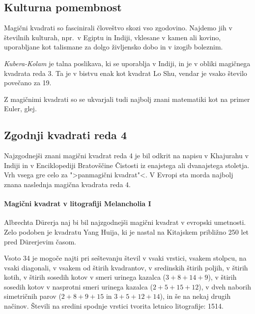 \documentclass[a4paper,12pt]{article}
\theoremstyle{definition}
\theoremstyle{plain}
\begin{document}

\subsection{Kulturna pomembnost}

Magični kvadrati so fascinirali človeštvo skozi vso zgodovino. Najdemo jih
v številnih kulturah, npr.\ v Egiptu in Indiji, vklesane v kamen ali
kovino, uporabljane kot talismane za dolgo življensko dobo in v
izogib boleznim.

\emph{Kubera-Kolam} je talna poslikava, ki se uporablja v Indiji, in je v
obliki magičnega kvadrata reda 3. Ta je v bistvu enak kot kvadrat
Lo Shu, vendar je vsako število povečano za 19.

Z magičnimi kvadrati so se ukvarjali tudi najbolj znani matematiki kot na
primer Euler, glej\cite{euler}. %


\subsection{Zgodnji kvadrati reda 4}

Najzgodnejši znani magični kvadrat reda 4 je bil odkrit na napisu
v Khajurahu v Indiji in v Enciklopediji Bratovščine Čistosti iz enajstega
ali dvanajstega stoletja. Vrh vsega gre celo za ">panmagični kvadrat"<.
V Evropi sta morda najbolj znana naslednja magična kvadrata reda 4.

\paragraph{Magični kvadrat v litografiji Melancholia I}
Albrechta Dürerja naj bi bil najzgodnejši magični kvadrat
v evropski umetnosti. Zelo podoben je kvadratu Yang Huija, ki je nastal na Kitajskem
približno 250 let pred Dürerjevim časom.

Vsoto 34 je mogoče najti pri seštevanju števil v vsaki vrstici, vsakem stolpcu,
na vsaki diagonali, v vsakem od štirih kvadrantov, v sredinskih štirih poljih,
v štirih kotih, v štirih sosedih kotov v smeri urinega kazalca (\(3+8+14+9\)), v
štirih sosedih kotov v nasprotni smeri urinega kazalca (\(2+5+15+12\)), v dveh naborih
simetričnih parov (\(2+8+9+15\) in \(3+5+12+14\)), in še na nekaj drugih načinov.
Števili na sredini spodnje vrstici tvorita letnico litografije: 1514.
\end{document}
